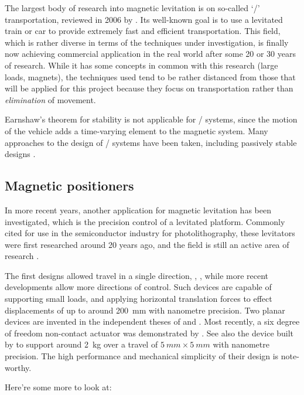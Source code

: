 The largest body of research into magnetic levitation is on so-called `\maglev/'
transportation, reviewed in 2006 by \textcite{lee2006}.
Its well-known goal is to use a levitated train or car to provide extremely fast and efficient transportation.
This field, which is rather diverse in terms of the techniques under investigation, is finally now achieving commercial application in the real world after some 20 or 30 years
of research.
While it has some concepts in common with this research (large loads, magnets), the techniques used tend to be rather distanced from those that will be applied for this project because they focus on transportation rather than \emph{elimination} of movement.

Earnshaw's theorem for stability is not applicable for \maglev/ systems, since the motion of the vehicle adds a time-varying element to the magnetic system.
Many approaches to the design of \maglev/ systems have been taken, including passively stable designs \cite{musolino2009}.

\subsection{Magnetic positioners}

In more recent years, another application for magnetic levitation has been investigated, which is the precision control of a levitated platform.
Commonly cited for use in the semiconductor industry for photolithography, these levitators were first researched around 20 years ago, and the field is still an active area of research \cite{fulford2008,fulford2009}.

The first designs allowed travel in a single direction, \eg, \textcite{trumper1992}, while more recent developments allow more directions of control.
Such devices are capable of supporting small loads, and applying horizontal translation forces to effect displacements of up to around \SI{200}{mm} with nanometre precision.
Two planar devices are invented in the independent theses of \textcite{kim1997} and \textcite{molenaar2000}.
Most recently, a six degree of freedom non-contact actuator was demonstrated by \textcite{verma2004}.
See also the device built by \textcite{kim2007} to support around \SI{2}{kg} over a travel of $\SI{5}{mm}\times\SI{5}{mm}$ with nanometre precision.
The high performance and mechanical simplicity of their design is note-worthy.

Here're some more to look at: \textcite{boeij2008,zhang2008a}

